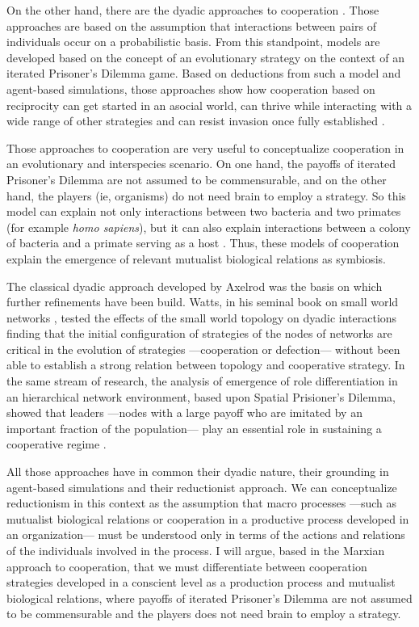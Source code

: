 On the other hand, there are the dyadic approaches to cooperation \citep{axelrod1981,axelrod:1997}. Those approaches are based on the assumption that interactions between pairs of individuals occur on a probabilistic basis. From this standpoint, models are developed based on the concept of an evolutionary strategy on the context of an iterated Prisoner's Dilemma game. Based on deductions from such a model and agent-based simulations, those approaches show how cooperation based on reciprocity can get started in an asocial world, can thrive while interacting with a wide range of other strategies and can resist invasion once fully established \citep{axelrod1981}.

Those approaches to cooperation are very useful to conceptualize cooperation in an evolutionary and interspecies scenario. On one hand, the payoffs of iterated Prisoner's Dilemma are not assumed to be commensurable, and on the other hand, the players (ie, organisms) do not need brain to employ a strategy. So this model can explain not only interactions between two bacteria and two primates (for example \emph{homo sapiens}), but it can also explain interactions between a colony of bacteria and a primate serving as a host \citep[211]{axelrod1981}. Thus, these models of cooperation explain the emergence of relevant mutualist biological relations as symbiosis.

The classical dyadic approach developed by Axelrod was the basis on which further refinements have been build. Watts, in his seminal book on small world networks \citep{watts:1999}, tested the effects of the small world topology on dyadic interactions finding that the initial configuration of strategies of the nodes of networks are critical in the evolution of strategies ---cooperation or defection--- without been able to establish a strong relation between topology and cooperative strategy. In the same stream of research, the analysis of emergence of role differentiation in an hierarchical network environment, based upon Spatial Prisioner's Dilemma, showed that leaders ---nodes with a large payoff who are imitated by an important fraction of the population--- play an essential role in sustaining a cooperative regime \citep*{eguiluz:2005}.

All those approaches have in common their dyadic nature, their grounding in agent-based simulations and their reductionist approach. We can conceptualize reductionism in this context as the assumption that macro processes ---such as mutualist biological relations or cooperation in a productive process developed in an organization--- must be understood only in terms of the actions and relations of the individuals involved in the process. I will argue, based in the Marxian approach to cooperation, that we must differentiate between cooperation strategies developed in a conscient level as a production process and mutualist biological relations, where payoffs of iterated Prisoner's Dilemma are not assumed to be commensurable and the players does not need brain to employ a strategy.

